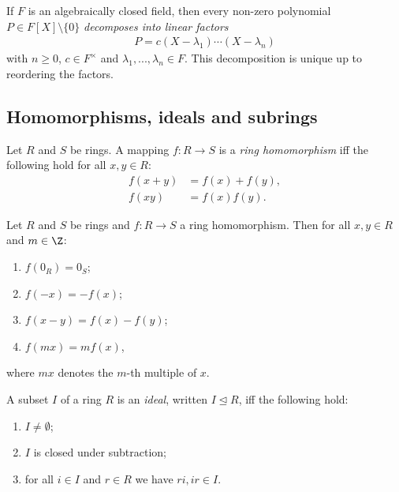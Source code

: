 \documentclass{article}
\begin{document}
\begin{theorem}[Theorem 3.3.14]
	If $F$ is an algebraically closed field, then every non-zero polynomial
	$P\in F[X]\setminus\{0\}$ \emph{decomposes into linear factors}
	\begin{align*}
		P=c(X-\lambda_1)\cdots(X-\lambda_n)
	\end{align*}
	with $n\geq 0$, $c\in F^\times$ and $\lambda_1,...,\lambda_n\in F$. This
	decomposition is unique up to reordering the factors.
\end{theorem}

\subsection{Homomorphisms, ideals and subrings}

\begin{definition}
	Let $R$ and $S$ be rings. A mapping $f:R\to S$ is a \emph{ring homomorphism} iff
	the following hold for all $x,y\in R$:
	\begin{align*}
		f(x+y) & = f(x) + f(y), \\
		f(xy)  & = f(x)f(y).
	\end{align*}
\end{definition}

\begin{lemma}[Lemma 3.4.5]
	Let $R$ and $S$ be rings and $f:R\to S$ a ring homomorphism. Then for all $x,y\in R$
	and $m\in\Z$:
	\begin{enumerate}
		\item $f(0_R)=0_S$;
		\item $f(-x)=-f(x)$;
		\item $f(x-y)=f(x)-f(y)$;
		\item $f(mx)=mf(x)$,
	\end{enumerate}
	where $mx$ denotes the $m$-th multiple of $x$.
\end{lemma}

\begin{definition}
	A subset $I$ of a ring $R$ is an \emph{ideal}, written $I\trianglelefteq R$, iff
	the following hold:
	\begin{enumerate}
		\item $I\not=\emptyset$;
		\item $I$ is closed under subtraction;
		\item for all $i\in I$ and $r\in R$ we have $ri,ir\in I$.
	\end{enumerate}
\end{definition}
\end{document}
